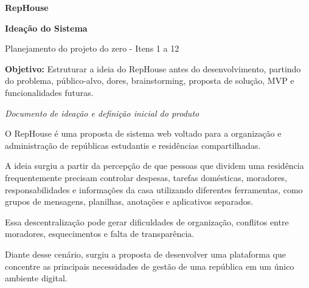 \documentclass[11pt,letterpaper]{article}
\newcommand{\ideasection}[1]{%
  \vspace{4pt}{\color{ideaorange}\sffamily\bfseries\fontsize{17}{20}\selectfont #1\par}\vspace{7pt}}
\begin{document}
\fontsize{10.8}{13}\selectfont

\vspace*{1.45in}
\begin{center}
  {\color{ideaorange}\bfseries\fontsize{31}{35}\selectfont RepHouse\par}
  \vspace{20pt}
  {\color{darkgray}\bfseries\fontsize{26}{30}\selectfont Ideação do Sistema\par}
  \vspace{12pt}
  {\color{headergray}\fontsize{15}{19}\selectfont Planejamento do projeto do zero - Itens 1 a 12\par}
\end{center}
\vspace{55pt}
\begin{tcolorbox}[creambox]
  \textcolor{ideaorange}{\textbf{Objetivo:}} Estruturar a ideia do RepHouse antes do desenvolvimento, partindo do problema,
  público-alvo, dores, brainstorming, proposta de solução, MVP e funcionalidades futuras.
\end{tcolorbox}
\vspace{32pt}
\begin{center}
  {\color{headergray}\itshape Documento de ideação e definição inicial do produto}
\end{center}

\newpage
\ideasection{1. Introdução}
O RepHouse é uma proposta de sistema web voltado para a organização e administração de
repúblicas estudantis e residências compartilhadas.

A ideia surgiu a partir da percepção de que pessoas que dividem uma residência frequentemente
precisam controlar despesas, tarefas domésticas, moradores, responsabilidades e informações da
casa utilizando diferentes ferramentas, como grupos de mensagens, planilhas, anotações e
aplicativos separados.

Essa descentralização pode gerar dificuldades de organização, conflitos entre moradores,
esquecimentos e falta de transparência.

Diante desse cenário, surgiu a proposta de desenvolver uma plataforma que concentre as
principais necessidades de gestão de uma república em um único ambiente digital.
\end{document}
